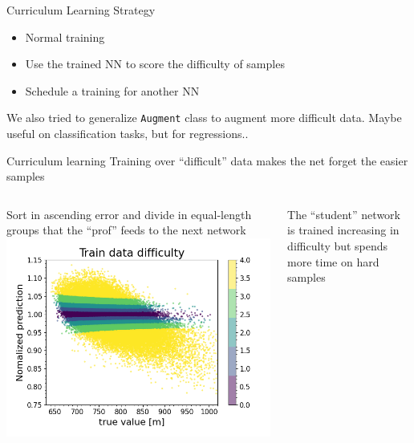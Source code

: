 \documentclass{beamer}
\begin{document}
\begin{frame}{Curriculum Learning Strategy}
    \begin{itemize}
        \item Normal training
        \item Use the trained NN to score the difficulty of samples
        \item Schedule a training for another NN
    \end{itemize}
    We also tried to generalize \texttt{Augment} class to augment more difficult data.
    \vfill
    Maybe useful on classification tasks, but for regressions..
\end{frame}

\begin{frame}{Curriculum learning}
    Training over ``difficult'' data makes the net forget the easier samples
    \vfill
    \begin{columns}
        \begin{column}{.5\textwidth}
            Sort in ascending error and divide in equal-length groups that the ``prof'' feeds to the next network
            \includegraphics[width=\textwidth]{figures/curriculum_before.png}
        \end{column}
        \begin{column}{.5\textwidth}
            The ``student'' network is trained increasing in difficulty but spends more time on 
            hard samples

\end{column}
\end{columns}
\end{frame}
\end{document}
